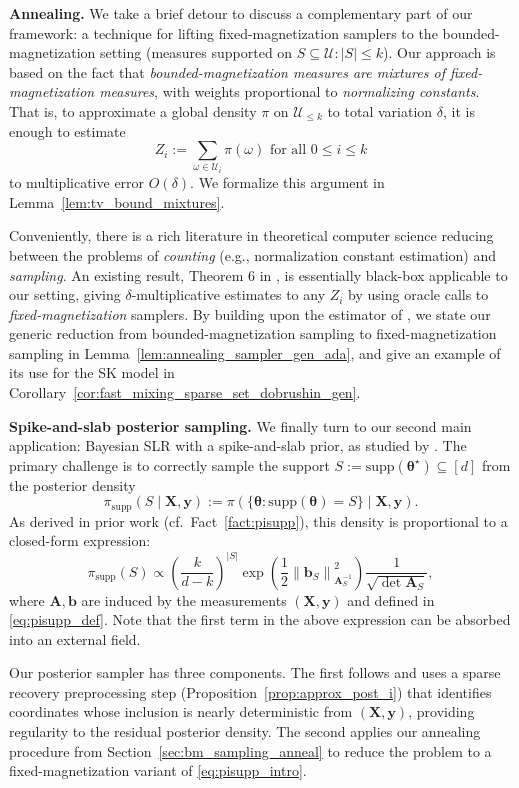 \documentclass[11pt]{article}
\newcommand{\defeq}{:=}
\newcommand{\norm}[1]{\left\lVert#1\right\rVert}
\newcommand{\half}{\frac{1}{2}}
\newcommand{\1}{\mathbf{1}}
\newcommand{\0}{\mathbf{0}}
\newcommand{\Par}[1]{\left(#1\right)}
\newcommand{\supp}{\mathrm{supp}}
\newcommand{\vth}{\boldsymbol{\theta}}
\newcommand{\vths}{\vth^\star}
\newcommand{\pisupp}{\pi_{\supp}}
\newcommand{\ma}{{\mathbf{A}}}
\newcommand{\mx}{{\mathbf{X}}}
\newcommand{\vb}{{\mathbf{b}}}
\newcommand{\vy}{{\mathbf{y}}}
\newcommand{\calU}{{\mathcal{U}}}
\begin{document}
\textbf{Annealing.} We take a brief detour to discuss a complementary part of our framework: a technique for lifting fixed-magnetization samplers to the bounded-magnetization setting (measures supported on $S \subseteq \calU : |S| \le k$). 
Our approach is based on the fact that \emph{bounded-magnetization measures are mixtures of fixed-magnetization measures}, with weights proportional to \emph{normalizing constants}. That is, to approximate a global density $\pi$ on $\calU_{\le k}$ to total variation $\delta$, it is enough to estimate
\[Z_i \defeq \sum_{\omega \in \calU_i} \pi(\omega) \text{ for all } 0 \le i \le k\]
to multiplicative error $O(\delta)$.
We formalize this argument in Lemma~\ref{lem:tv_bound_mixtures}.

Conveniently, there is a rich literature in theoretical computer science reducing between the problems of \emph{counting} (e.g., normalization constant estimation) and \emph{sampling}. An existing result, Theorem 6 in \cite{Kolmogorov18}, is essentially black-box applicable to our setting, giving $\delta$-multiplicative estimates to any $Z_i$ by using oracle calls to \emph{fixed-magnetization} samplers. By building upon the estimator of \cite{Kolmogorov18}, we state our generic reduction from bounded-magnetization sampling to fixed-magnetization sampling in Lemma~\ref{lem:annealing_sampler_gen_ada}, and give an example of its use for the SK model in Corollary~\ref{cor:fast_mixing_sparse_set_dobrushin_gen}.

\textbf{Spike-and-slab posterior sampling.} We finally turn to our second main application: Bayesian SLR with a spike-and-slab prior, as studied by \cite{KumarSTZ25, MontanariW26}. The primary challenge is to correctly sample the support $S \defeq \supp(\vths) \subseteq [d]$ from the posterior density 
\[\pisupp(S \mid \mx, \vy) \defeq \pi(\{\vth: \supp(\vth) = S\} \mid \mx, \vy).\]
As derived in prior work (cf.\ Fact~\ref{fact:pisupp}), this density is proportional to a closed-form expression:
\begin{equation}\label{eq:pisupp_intro}\pisupp(S) \propto \Par{\frac k {d - k}}^{|S|}\exp\Par{\half\norm{\vb_S}^2_{\ma_S^{-1}}}\frac 1 {\sqrt {\det \ma_S}},\end{equation}
where $\ma, \vb$ are induced by the measurements $(\mx, \vy)$ and defined in \eqref{eq:pisupp_def}. Note that the first term in the above expression can be absorbed into an external field.

Our posterior sampler has three components. The first follows
\cite{KumarSTZ25} and uses a sparse recovery preprocessing step (Proposition~\ref{prop:approx_post_i}) that
identifies coordinates whose inclusion is nearly deterministic from $(\mx, \vy)$, providing regularity to the residual posterior density. The second applies our annealing procedure from Section~\ref{sec:bm_sampling_anneal} to reduce the problem to a fixed-magnetization variant of \eqref{eq:pisupp_intro}.
\end{document}
